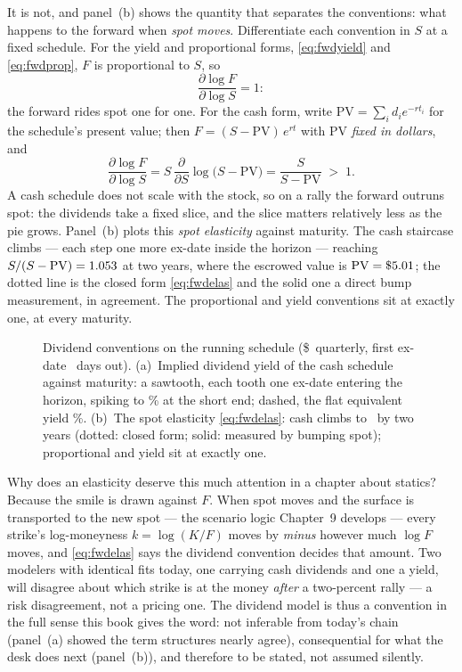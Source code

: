 It is not, and panel~(b) shows the quantity that separates the
conventions: what happens to the forward when \emph{spot moves}.  Differentiate each convention
in $S$ at a fixed schedule.  For the yield and proportional forms,
\eqref{eq:fwdyield} and \eqref{eq:fwdprop}, $F$ is proportional to
$S$, so
\[
\frac{\partial\log F}{\partial\log S}=1 :
\]
the forward rides spot one for one.  For the cash form, write
$\mathrm{PV}=\sum_id_ie^{-rt_i}$ for the schedule's present value;
then $F=(S-\mathrm{PV})\,e^{rt}$ with $\mathrm{PV}$ \emph{fixed in
dollars}, and
\begin{equation}
\frac{\partial\log F}{\partial\log S}
=S\,\frac{\partial}{\partial S}\log\big(S-\mathrm{PV}\big)
=\frac{S}{S-\mathrm{PV}}\;>\;1 .
\label{eq:fwdelas}
\end{equation}
A cash schedule does not scale with the stock, so on a rally the
forward outruns spot: the dividends take a fixed slice, and the
slice matters relatively less as the pie grows.  Panel~(b) plots this
\emph{spot elasticity} against maturity.  The cash staircase climbs
--- each step one more ex-date inside the horizon --- reaching
$S/(S-\mathrm{PV})=1.053$ at two years, where the
escrowed value is $\mathrm{PV}=\$5.01$; the dotted line
is the closed form
\eqref{eq:fwdelas} and the solid one a direct bump measurement, in
agreement.  The proportional and yield conventions sit at exactly
one, at every maturity.

\begin{figure}[htbp]
\centering
{}
\caption{Dividend conventions on the running schedule
(\$\MacFwdDivCashDollars\ quarterly, first ex-date
\MacFwdDivFirstDays\ days out).  (a)~Implied dividend yield of the
cash schedule against maturity: a sawtooth, each tooth one ex-date
entering the horizon, spiking to \MacFwdDivToothPct\% at the short
end; dashed, the flat equivalent yield \MacFwdDivQeqPct\%.
(b)~The spot elasticity \eqref{eq:fwdelas}: cash climbs to
\MacFwdDivElasTwoYr\ by two years (dotted: closed form; solid:
measured by bumping spot); proportional and yield sit at exactly
one.}
\label{fig:fwddivs}
\end{figure}

Why does an elasticity deserve this much attention in a chapter about
statics?  Because the smile is drawn against $F$.  When spot moves and
the surface is transported to the new spot --- the scenario logic
Chapter~9 develops --- every strike's log-moneyness
$k=\log(K/F)$ moves by \emph{minus} however much $\log F$ moves, and
\eqref{eq:fwdelas} says the dividend convention decides that
amount.  Two modelers with identical fits
today, one carrying cash dividends and one a yield, will disagree
about which strike is at the money \emph{after} a two-percent rally
--- a risk disagreement, not a pricing one.  The dividend model is
thus a convention in the full sense this book gives the word: not
inferable from today's chain (panel~(a) showed the term structures
nearly agree), consequential for what the desk does next
(panel~(b)), and therefore to be stated, not assumed silently.


